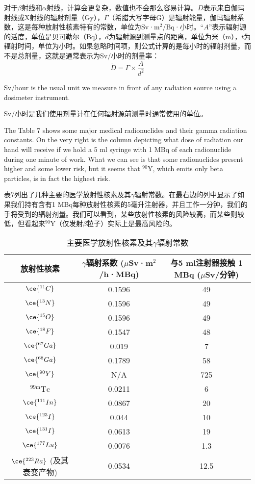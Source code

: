 \documentclass[dvipsnames, svgnames,a4paper,11pt]{article}
\begin{document}
对于$\beta$射线和$\alpha$射线，计算会更复杂，数值也不会那么容易计算。\(D\)表示来自伽玛射线或X射线的辐射剂量（Gy），\(\Gamma\)（希腊大写字母G）是辐射能量，伽玛辐射系数，这是每种放射性核素特有的常数，单位为Sv·m\(^2\)/Bq·小时。“\(A\)”表示辐射源的活度，单位是贝可勒尔（Bq），\(d\)为辐射源到测量点的距离，单位为米（m），\(t\)为辐射时间，单位为小时。如果忽略时间项，则公式计算的是每小时的辐射剂量，而不是总剂量，这就是通常表示为Sv/小时的剂量率：
\[
\dot{D} = \Gamma \times \frac{A}{d^{2}}
\]

Sv/hour is the usual unit we measure in front of any radiation source using a dosimeter instrument.

Sv/小时是我们使用剂量计在任何辐射源前测量时通常使用的单位。

The Table 7 shows some major medical radionuclides and their gamma radiation constants. On the very right is the column depicting what dose of radiation our hand will receive if we hold a 5 ml syringe with 1 MBq of each radionuclide during one minute of work. What we can see is that some radionuclides present higher and some lower risk, but it seems that \(\mathrm{^{90}Y}\), which emits only beta particles, is in fact the highest risk.

表7列出了几种主要的医学放射性核素及其$\gamma$辐射常数。在最右边的列中显示了如果我们持有含有1 MBq每种放射性核素的5毫升注射器，并且工作一分钟，我们的手将受到的辐射剂量。我们可以看到，某些放射性核素的风险较高，而某些则较低，但看起来\(\mathrm{^{90}Y}\)（仅发射$\beta$粒子）实际上是最高风险的。

\begin{table}[h!]
\centering
\begin{tabular}{ccc}
\hline
\textbf{放射性核素} & \textbf{$\gamma$辐射系数} (\(\mu\)Sv·m\(^2\)/h·MBq) & \textbf{与5 ml注射器接触 1 MBq (\(\mu\)Sv/分钟)} \\
\hline
\(\ce{^{11}C}\) & 0.1596 & 49 \\
\(\ce{^{13}N}\) & 0.1596 & 49 \\
\(\ce{^{15}O}\) & 0.1596 & 49 \\
\(\ce{^{18}F}\) & 0.1547 & 48 \\
\(\ce{^{67}Ga}\) & 0.019 & 7 \\
\(\ce{^{68}Ga}\) & 0.1789 & 58 \\
\(\ce{^{90}Y}\) & N/A & 725 \\
\(\mathrm{^{99m}Tc}\) & 0.0211 & 6 \\
\(\ce{^{111}In}\) & 0.0867 & 20 \\
\(\ce{^{123}I}\) & 0.044 & 10 \\
\(\ce{^{131}I}\) & 0.0613 & 19 \\
\(\ce{^{177}Lu}\) & 0.0076 & 1.3 \\
\(\ce{^{223}Ra}\) (及其衰变产物) & 0.0534 & 12.5 \\
\hline
\end{tabular}
\caption{主要医学放射性核素及其$\gamma$辐射常数}
\end{table}
\end{document}
